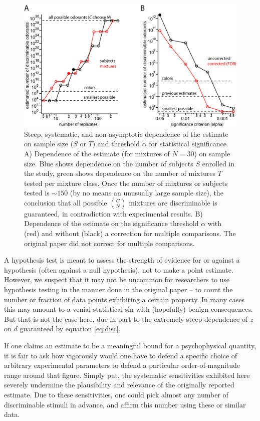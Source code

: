 \documentclass[letterpaper,twocolumn,10pt]{article}
\begin{document}
\begin{figure}[!hbt]
    \centering
    \includegraphics[width=1.0\textwidth]{figures/Fig8_T_alpha_dependency}
    \caption{
Steep, systematic, and non-asymptotic dependence of the estimate on sample size ($S$ or $T$) and threshold $\alpha$ for statistical significance. 
A) Dependence of the estimate (for mixtures of $N=30$) on sample size. 
Blue shows dependence on the number of subjects $S$ enrolled in the study, 
green shows dependence on the number of mixtures $T$ tested per mixture class. 
Once the number of mixtures or subjects tested is $\sim 150$ (by no means an unusually large sample size), 
the conclusion that all possible ${C \choose N}$ mixtures are discriminable is guaranteed, in contradiction with experimental results. 
B) Dependence of the estimate on the significance threshold $\alpha$ with (red) and without (black) a correction for multiple comparisons. 
The original paper \cite{bushdid_humans_2014} did not correct for multiple comparisons.}
    \label{fig:alpha_dependency}
\end{figure} 

A hypothesis test is meant to assess the strength of evidence for or against a hypothesis (often against a null hypothesis), not to make a point estimate.  
However, we suspect that it may not be uncommon for researchers to use hypothesis testing in the manner done in the original paper -- 
to count the number or fraction of data points exhibiting a certain property.  
In many cases this may amount to a venial statistical sin with (hopefully) benign consequences.  
But that is not the case here, due in part to the extremely steep dependence of $z$ on $d$ guaranteed by equation \ref{eq:disc}. 

If one claims an estimate to be a meaningful bound for a psychophysical quantity, 
it is fair to ask how vigorously would one have to defend a specific choice of arbitrary experimental parameters to defend a particular order-of-magnitude range around that figure. 
Simply put, the systematic sensitivities exhibited here severely undermine the plausibility and relevance of the originally reported estimate. 
Due to these sensitivities, one could pick almost any number of discriminable stimuli in advance, 
and affirm this number using these or similar data. 
\end{document}
